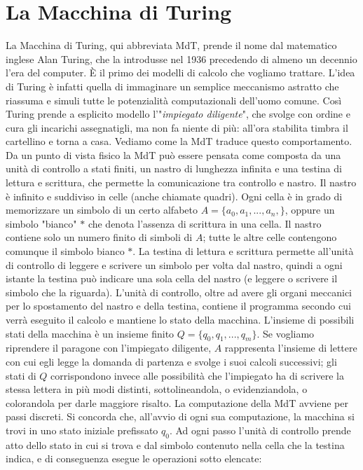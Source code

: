 \section{La Macchina di Turing}

La Macchina di Turing, qui abbreviata MdT, prende il nome dal matematico
inglese Alan Turing, che la introdusse nel 1936 precedendo di almeno un decennio
l'era del computer.
È il primo dei modelli di calcolo che vogliamo trattare.
L'idea di Turing è infatti
quella di immaginare un semplice meccanismo astratto che riassuma e
simuli tutte le potenzialità computazionali dell'uomo comune.
Così Turing prende a esplicito
modello l'"\textit{impiegato diligente}", che svolge con ordine e cura gli
incarichi assegnatigli, ma non fa niente di più:
all'ora stabilita timbra il cartellino e torna a casa.
Vediamo come la MdT traduce questo comportamento.
Da un punto di vista fisico la MdT può essere pensata come composta da una unità
di controllo a stati finiti, un nastro di lunghezza infinita e una testina di
lettura e scrittura, che permette la comunicazione tra controllo e nastro.
Il nastro è infinito e suddiviso in celle (anche chiamate quadri).
Ogni cella è in
grado di memorizzare un simbolo di un certo alfabeto $A = \{a_0, a_1, ..., a_n,\}$,
oppure un simbolo "bianco" $*$ che denota l'assenza di scrittura in una cella.
Il nastro contiene solo un numero finito di simboli di $A$;
tutte le altre celle contengono comunque il simbolo bianco $*$.
La testina di lettura e scrittura permette all'unità di
controllo di leggere e scrivere un simbolo per volta dal nastro,
quindi a ogni istante la testina può indicare una sola cella del nastro
(e leggere o scrivere il simbolo che la riguarda).
L'unità di controllo, oltre ad avere gli organi meccanici per lo
spostamento del nastro e della testina, contiene il programma secondo cui verrà
eseguito il calcolo e mantiene lo stato della macchina.
L'insieme di possibili stati della macchina è un insieme finito
$Q = \{q_0, q_1, ..., q_m\}$.
Se vogliamo riprendere il paragone con l'impiegato diligente, $A$
rappresenta l'insieme di lettere con cui egli legge la domanda di partenza e
svolge i suoi calcoli successivi;
gli stati di $Q$ corrispondono invece alle possibilità che l'impiegato ha
di scrivere la stessa lettera in più modi distinti, sottolineandola, o
evidenziandola, o colorandola per darle maggiore risalto.
La computazione della MdT avviene per passi discreti. Si concorda che, all'avvio
di ogni sua computazione, la macchina si trovi in uno stato iniziale prefissato
$q_0$.
Ad ogni passo l'unità di controllo prende atto dello stato in cui si trova e dal
simbolo contenuto nella cella che la testina indica, e di conseguenza esegue le
operazioni sotto elencate:

